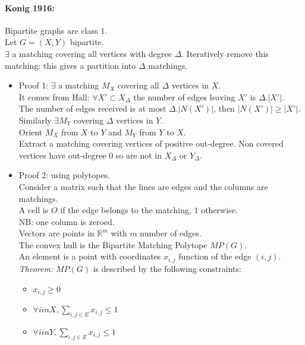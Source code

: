 \documentclass[12pt]{article}
\begin{document}
\paragraph{Konig 1916:} Bipartite graphs are class 1.\\
Let $G=(X,Y)$ bipartite.\\
$\exists$ a matching covering all vertices with degree $\Delta$. Iteratively remove this matching: this gives a partition into $\Delta$ matchings.\\
\begin{itemize}
\item Proof 1: $\exists$ a matching $M_X$ covering all $\Delta$ vertices in $X$.\\
	It comes from Hall: $\forall X' \subset X_\Delta$ the number of edges leaving $X'$ is $\Delta.|X'|$.\\
	The number of edges received is at most $\Delta.|N(X')|$, then $|N(X')| \geqslant |X'|$.\\
	Similarly $\exists M_Y$ covering $\Delta$ vertices in $Y$.\\
	Orient $M_X$ from $X$ to $Y$ and $M_Y$ from $Y$ to $X$.\\
	Extract a matching covering vertices of positive out-degree. Non covered vertices have out-degree $0$ so are not in $X_\Delta$ or $Y_\Delta$.\\
\item Proof 2: using polytopes.\\
	Consider a matrix such that the lines are edges and the columns are matchings.\\
	A cell is $O$ if the edge belongs to the matching, $1$ otherwise.\\
	NB: one column is zeroed.\\
	Vectors are points in $\mathbb{R}^m$ with $m$ number of edges.\\
	The convex hull is the Bipartite Matching Polytope $MP(G)$.\\
	An element is a point with coordinates $x_{i,j}$ function of the edge $(i,j)$.\\
	\emph{Theorem:} $MP(G)$ is described by the following constraints:
	\begin{itemize}
	\item $x_{i,j} \geqslant 0$
	\item $\forall i in X, \sum\limits_{i,j \in E}x_{i,j} \leqslant 1$
	\item $\forall i in Y, \sum\limits_{i,j \in E}x_{i,j} \leqslant 1$
	\end{itemize}

\end{itemize}
\end{document}
